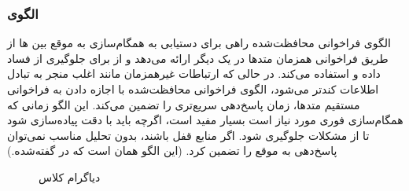 \subsubsection{الگوی }
\label{archConGuardCallSec}
\begin{RTL}
الگوی فراخوانی محافظت‌شده \cite{ref4} راهی برای دستیابی به همگام‌سازی به موقع بین
ها از طریق فراخوانی همزمان متدها در یک
 دیگر ارائه می‌دهد و از  
برای جلوگیری از فساد داده و  استفاده می‌کند.
در حالی که ارتباطات غیرهمزمان مانند 
اغلب منجر به تبادل اطلاعات کندتر می‌شود، الگوی فراخوانی محافظت‌شده
با اجازه دادن به فراخوانی مستقیم متدها، زمان پاسخ‌دهی سریع‌تری را تضمین می‌کند.
این الگو زمانی که همگام‌سازی فوری مورد نیاز است بسیار مفید است،
اگرچه باید با دقت پیاده‌سازی شود تا از مشکلات 
جلوگیری شود. اگر منابع قفل باشند، بدون تحلیل مناسب نمی‌توان پاسخ‌دهی به موقع
را تضمین کرد.
(این الگو همان  است که در
\cite{ref1} گفته‌شده.)
\end{RTL}
\begin{figure}[h!]
\centering
{}
\caption{دیاگرام کلاس }
\label{archConGuardCallClassDiag}
\end{figure}